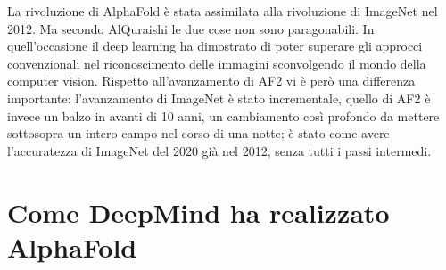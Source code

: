 \par La rivoluzione di AlphaFold è stata assimilata alla rivoluzione di ImageNet nel 2012. Ma secondo AlQuraishi le due cose non sono paragonabili. In quell'occasione il deep learning ha dimostrato di poter superare gli approcci convenzionali nel riconoscimento delle immagini sconvolgendo il mondo della computer vision. Rispetto all'avanzamento di AF2 vi è però una differenza importante: l'avanzamento di ImageNet è stato incrementale, quello di AF2 è invece un balzo in avanti di 10 anni, un cambiamento così profondo da mettere sottosopra un intero campo nel corso di una notte; è stato come avere l'accuratezza di ImageNet del 2020 già nel 2012, senza tutti i passi intermedi.

\section{Come DeepMind ha realizzato AlphaFold}
